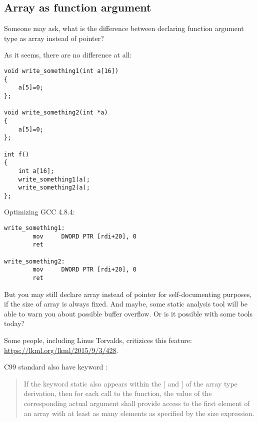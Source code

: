 \subsection{Array as function argument}

Someone may ask, what is the difference between declaring function argument type as array instead of pointer?

As it seems, there are no difference at all:

\begin{lstlisting}
void write_something1(int a[16])
{
	a[5]=0;
};

void write_something2(int *a)
{
	a[5]=0;
};

int f()
{
	int a[16];
	write_something1(a);
	write_something2(a);
};
\end{lstlisting}

Optimizing GCC 4.8.4:

\begin{lstlisting}
write_something1:
        mov     DWORD PTR [rdi+20], 0
        ret

write_something2:
        mov     DWORD PTR [rdi+20], 0
        ret
\end{lstlisting}

But you may still declare array instead of pointer for self-documenting purposes, if the size of array is always fixed.
And maybe, some static analysis tool will be able to warn you about possible buffer overflow.
Or is it possible with some tools today?

Some people, including Linus Torvalds, critizices this \CCpp feature: \url{https://lkml.org/lkml/2015/9/3/428}.

C99 standard also have  keyword :

\begin{framed}
\begin{quotation}
If the keyword static also appears  within the [ and ] of the array type derivation, then for each call to the function, the value of the corresponding actual argument shall provide access to the first element of an array with at least as many elements as specified by the size expression.
\end{quotation}
\end{framed}


